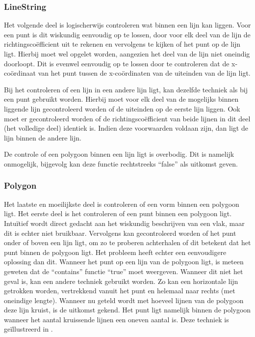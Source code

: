 \subsubsection{LineString}
Het volgende deel is logischerwijs controleren wat binnen een lijn kan liggen. Voor een punt is dit wiskundig eenvoudig op te lossen, door voor elk deel van de lijn de richtingscoëfficient uit te rekenen en vervolgens te kijken of het punt op de lijn ligt. Hierbij moet wel opgelet worden, aangezien het deel van de lijn niet oneindig doorloopt. Dit is evenwel eenvoudig op te lossen door te controleren dat de x-coördinaat van het punt tussen de x-coördinaten van de uiteinden van de lijn ligt.

Bij het controleren of een lijn in een andere lijn ligt, kan dezelfde techniek als bij een punt gebruikt worden. Hierbij moet voor elk deel van de mogelijks binnen liggende lijn gecontroleerd worden of de uiteinden op de eerste lijn liggen. Ook moet er gecontroleerd worden of de richtingscoëfficient van beide lijnen in dit deel (het volledige deel) identiek is. Indien deze voorwaarden voldaan zijn, dan ligt de lijn binnen de andere lijn. 

De controle of een polygoon binnen een lijn ligt is overbodig. Dit is namelijk onmogelijk, bijgevolg kan deze functie rechtstreeks ``false'' als uitkomst geven.

\subsubsection{Polygon}
Het laatste en moeilijkste deel is controleren of een vorm binnen een polygoon ligt. Het eerste deel is het controleren of een punt binnen een polygoon ligt. Intuïtief wordt direct gedacht aan het wiskundig beschrijven van een vlak, maar dit is echter niet bruikbaar. Vervolgens kan gecontroleerd worden of het punt onder of boven een lijn ligt, om zo te proberen achterhalen of dit betekent dat het punt binnen de polygoon ligt. Het probleem heeft echter een eenvoudigere oplossing dan dit. Wanneer het punt op een lijn van de polygoon ligt, is meteen geweten dat de ``contains'' functie ``true'' moet weergeven. Wanneer dit niet het geval is, kan een andere techniek gebruikt worden. Zo kan een horizontale lijn getrokken worden, vertrekkend vanuit het punt en helemaal naar rechts (met oneindige lengte). Wanneer nu geteld wordt met hoeveel lijnen van de polygoon deze lijn kruist, is de uitkomst gekend. Het punt ligt namelijk binnen de polygoon wanneer het aantal kruissende lijnen een oneven aantal is. Deze techniek is geïllustreerd in .

